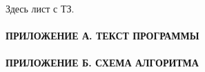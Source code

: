 \documentclass[12pt, a4paper, simple]{eskdtext}
\begin{document}
    \begin{ESKDtitlePage}
        
    \end{ESKDtitlePage}

    Здесь лист с ТЗ.
    \newpage

    \tableofcontents
    \paragraph{ПРИЛОЖЕНИЕ А. ТЕКСТ ПРОГРАММЫ}
    \paragraph{ПРИЛОЖЕНИЕ Б. СХЕМА АЛГОРИТМА}
    \newpage

     
     
    
    
    
    
    
\end{document}
